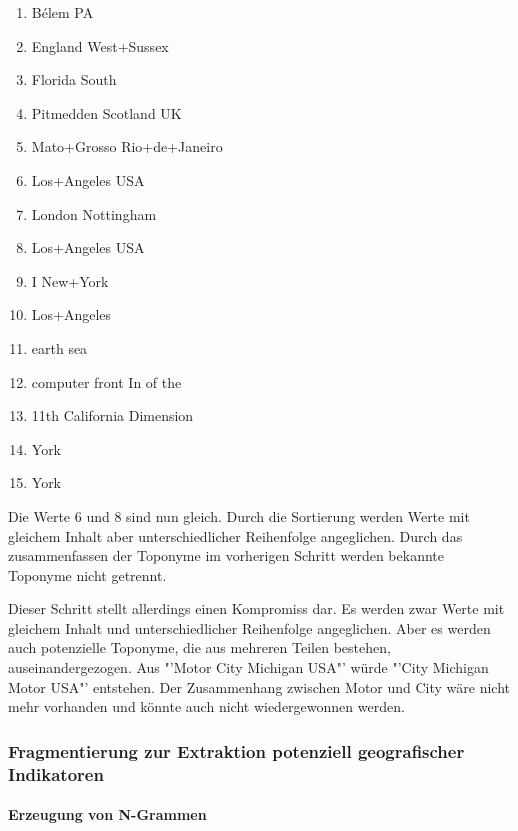 				\begin{multicols}{2}
					\begin{enumerate}
						\item Bélem PA
						\item England West+Sussex
						\item Florida South
						\item Pitmedden Scotland UK
						\item Mato+Grosso Rio+de+Janeiro
						\item Los+Angeles USA
						\item London Nottingham
						\item Los+Angeles USA
						\item I New+York 
						\item Los+Angeles
						\item earth sea
						\item computer front In of the 
						\item 11th California Dimension 
						\item York
						\item York
					\end{enumerate}
				\end{multicols}

				Die Werte 6 und 8 sind nun gleich. 
				Durch die Sortierung werden Werte mit gleichem Inhalt aber unterschiedlicher Reihenfolge angeglichen.
				Durch das zusammenfassen der Toponyme im vorherigen Schritt werden bekannte Toponyme nicht getrennt.

				Dieser Schritt stellt allerdings einen Kompromiss dar.
				Es werden zwar Werte mit gleichem Inhalt und unterschiedlicher Reihenfolge angeglichen.
				Aber es werden auch potenzielle Toponyme, die aus mehreren Teilen bestehen, auseinandergezogen.
				Aus "'Motor City Michigan USA"' würde "'City Michigan Motor USA"' entstehen.
				Der Zusammenhang zwischen Motor und City wäre nicht mehr vorhanden und könnte auch nicht wiedergewonnen werden.

			\subsubsection{Fragmentierung zur Extraktion potenziell geografischer Indikatoren} 

				\paragraph{Erzeugung von N-Grammen}

